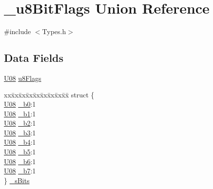 \hypertarget{union__u8_bit_flags}{}\section{\+\_\+u8\+Bit\+Flags Union Reference}
\label{union__u8_bit_flags}


{\ttfamily \#include $<$Types.\+h$>$}

\subsection*{Data Fields}
\begin{DoxyCompactItemize}
\item 
\hyperlink{_types_8h_a3fd534ebc238a0e487b81bda78811de6}{U08} \hyperlink{union__u8_bit_flags_a0cd07a5ca168d474cadc27f8b3ee2334}{u8\+Flags}
\item 
\begin{tabbing}
xx\=xx\=xx\=xx\=xx\=xx\=xx\=xx\=xx\=\kill
struct \{\\
\>\hyperlink{_types_8h_a3fd534ebc238a0e487b81bda78811de6}{U08} \hyperlink{union__u8_bit_flags_a1f5f46b8e2d3b8f7e8cc504484fd3b40}{\_b0}:1\\
\>\hyperlink{_types_8h_a3fd534ebc238a0e487b81bda78811de6}{U08} \hyperlink{union__u8_bit_flags_a7f172068ad93cbd4fe886bceb87d5453}{\_b1}:1\\
\>\hyperlink{_types_8h_a3fd534ebc238a0e487b81bda78811de6}{U08} \hyperlink{union__u8_bit_flags_aa268d657cf81f4254da2229854c0b034}{\_b2}:1\\
\>\hyperlink{_types_8h_a3fd534ebc238a0e487b81bda78811de6}{U08} \hyperlink{union__u8_bit_flags_ad08c85efdbfe78eb3d90b5d6e39b5d3d}{\_b3}:1\\
\>\hyperlink{_types_8h_a3fd534ebc238a0e487b81bda78811de6}{U08} \hyperlink{union__u8_bit_flags_a52ef28131b76c94219770bbc98680401}{\_b4}:1\\
\>\hyperlink{_types_8h_a3fd534ebc238a0e487b81bda78811de6}{U08} \hyperlink{union__u8_bit_flags_ac1737c19b88091c851e0d6770687b54d}{\_b5}:1\\
\>\hyperlink{_types_8h_a3fd534ebc238a0e487b81bda78811de6}{U08} \hyperlink{union__u8_bit_flags_a9e73e7e910136553e62a219bbee98fb4}{\_b6}:1\\
\>\hyperlink{_types_8h_a3fd534ebc238a0e487b81bda78811de6}{U08} \hyperlink{union__u8_bit_flags_af21bc948213ba27c2bc340f47fdb8f3d}{\_b7}:1\\
\} \hyperlink{union__u8_bit_flags_adebc7ca89820176fc685134dd1709fc2}{\_sBits}\\

\end{tabbing}\end{DoxyCompactItemize}


